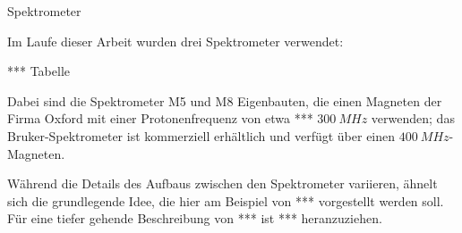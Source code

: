 Spektrometer 

Im Laufe dieser Arbeit wurden drei Spektrometer verwendet:

*** Tabelle

Dabei sind die Spektrometer M5 und M8 Eigenbauten, die einen Magneten der Firma Oxford mit einer Protonenfrequenz von etwa *** $\SI{300}{MHz}$ verwenden; das Bruker-Spektrometer ist kommerziell erhältlich und verfügt über einen $\SI{400}{MHz}$-Magneten.

Während die Details des Aufbaus zwischen den Spektrometer variieren, ähnelt sich die grundlegende Idee, die hier am Beispiel von *** vorgestellt werden soll. Für eine tiefer gehende Beschreibung von *** ist *** heranzuziehen.
